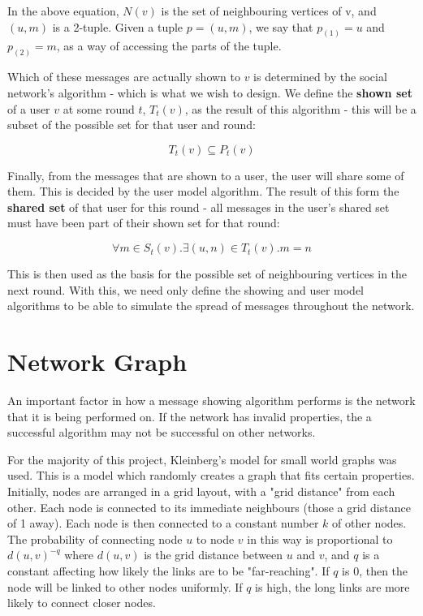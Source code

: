 \documentclass[bsc,frontabs,twoside,singlespacing,parskip,deptreport]{infthesis}     %
\begin{document}
In the above equation, $N(v)$ is the set of neighbouring vertices of v, and $(u, m)$ is a 2-tuple. Given a tuple $p = (u, m)$, we say that $p_{(1)} = u$ and $p_{(2)} = m$, as a way of accessing the parts of the tuple.

Which of these messages are actually shown to $v$ is determined by the social network's algorithm - which is what we wish to design. We define the \textbf{shown set} of a user $v$ at some round $t$, $T_{t}(v)$, as the result of this algorithm - this will be a subset of the possible set for that user and round:

\begin{equation}
T_{t}(v) \subseteq P_{t}(v)
\end{equation}

Finally, from the messages that are shown to a user, the user will share some of them. This is decided by the user model algorithm. The result of this form the \textbf{shared set} of that user for this round - all messages in the user's shared set must have been part of their shown set for that round:

\begin{equation}
\forall m \in S_{t}(v) . \exists (u, n) \in T_{t}(v) . m = n
\end{equation}

This is then used as the basis for the possible set of neighbouring vertices in the next round. With this, we need only define the showing and user model algorithms to be able to simulate the spread of messages throughout the network.

\section{Network Graph} \label{sec:graph_def}
An important factor in how a message showing algorithm performs is the network that it is being performed on. If the network has invalid properties, the a successful algorithm may not be successful on other networks.

For the majority of this project, Kleinberg's model for small world graphs was used\cite{Kleinberg00}. This is a model which randomly creates a graph that fits certain properties. Initially, nodes are arranged in a grid layout, with a "grid distance" from each other. Each node is connected to its immediate neighbours (those a grid distance of 1 away). Each node is then connected to a constant number $k$ of other nodes. The probability of connecting node $u$ to node $v$ in this way is proportional to $d(u, v)^{-q}$ where $d(u, v)$ is the grid distance between $u$ and $v$, and $q$ is a constant affecting how likely the links are to be "far-reaching". If $q$ is 0, then the node will be linked to other nodes uniformly. If $q$ is high, the long links are more likely to connect closer nodes.
\end{document}
